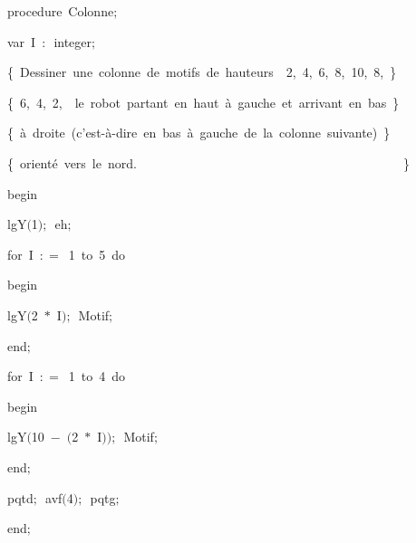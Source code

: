 {\pagebreak[3] 
\vspace{\neglskip}\mbox{\blc  \blk\idt  \mcl procedure\idt \ Colonne$;$}\par 
\pagebreak[3] 
\vspace{\neglskip}\mbox{\blc  \blk\blk\idt  \mcl var\idt \ I\ $:$\ integer$;$}\par 
\vspace{\neglskip}\mbox{\blc  \blk\blk\idt  \cmt  \{\ Dessiner\ une\ colonne\ de\ motifs\ de\ hauteurs\ \ 2,\ 4,\ 6,\ 8,\ 10,\ 8,\ \}\idt }\par 
\vspace{\neglskip}\mbox{\blc  \blk\blk\idt  \cmt  \{\ 6,\ 4,\ 2,\ \ le\ robot\ partant\ en\ haut\ à\ gauche\ et\ arrivant\ en\ bas\ \}\idt }\par 
\vspace{\neglskip}\mbox{\blc  \blk\blk\idt  \cmt  \{\ à\ droite\ (c{'}est-à-dire\ en\ bas\ à\ gauche\ de\ la\ colonne\ suivante)\ \}\idt }\par 
\vspace{\neglskip}\mbox{\blc  \blk\blk\idt  \cmt  \{\ orienté\ vers\ le\ nord.\ \ \ \ \ \ \ \ \ \ \ \ \ \ \ \ \ \ \ \ \ \ \ \ \ \ \ \ \ \ \ \ \ \ \ \ \ \ \ \ \ \ \}\idt }\par 
\vspace{\neglskip}\mbox{\blc  \blk\idt  \mcl begin\idt }\par 
\vspace{\neglskip}\mbox{\blc  \blk\blk\idt  lgY$($1$)$$;$\ eh$;$}\par 
\pagebreak[3] 
\vspace{\neglskip}\mbox{\blc  \blk\blk\idt  \mcl for\idt \ I\ $:$$=$\ 1\ \mcl to\idt \ 5\ \mcl do\idt }\par 
\vspace{\neglskip}\mbox{\blc  \blk\blk\blk\idt  \mcl begin\idt }\par 
\vspace{\neglskip}\mbox{\blc  \blk\blk\blk\blk\idt  lgY$($2\ $\ast$\ I$)$$;$\ Motif$;$\ }\par 
\vspace{\neglskip}\mbox{\blc  \blk\blk\blk\idt  \mcl end\idt $;$}\par 
\pagebreak[3] 
\vspace{\neglskip}\mbox{\blc  \blk\blk\idt  \mcl for\idt \ I\ $:$$=$\ 1\ \mcl to\idt \ 4\ \mcl do\idt }\par 
\vspace{\neglskip}\mbox{\blc  \blk\blk\blk\idt  \mcl begin\idt }\par 
\vspace{\neglskip}\mbox{\blc  \blk\blk\blk\blk\idt  lgY$($10\ $-$\ $($2\ $\ast$\ I$)$$)$$;$\ Motif$;$\ }\par 
\vspace{\neglskip}\mbox{\blc  \blk\blk\blk\idt  \mcl end\idt $;$}\par 
\vspace{\neglskip}\mbox{\blc  \blk\blk\idt  pqtd$;$\ avf$($4$)$$;$\ pqtg$;$}\par 
\vspace{\neglskip}\mbox{\blc  \blk\idt  \mcl end\idt $;$}\par 
\medskip

}
